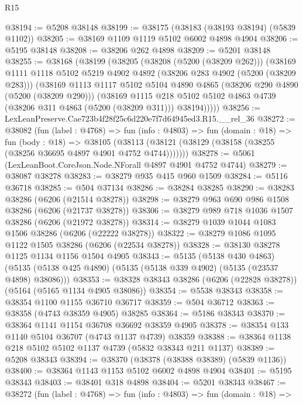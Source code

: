 \begin{lexlean}{R15}
\begin{coremodule}
{{{{{{{{{{{@38194 := @5208 @38148
@38199 := @38175 (@38183 (@38193 @38194) (@5839 @1102))
@38205 := @38169 @1109 @1119 @5102 @6002 @4898 @4904
@38206 := @5195 @38148
@38208 := @38206 @262 @4898
@38209 := @5201 @38148
@38255 := @38168
    (@38199
      (@38205
        (@38208 (@5200 (@38209 @262)))
        (@38169
          @1111
          @1118
          @5102
          @5219
          @4902
          @4892
          (@38206 @283 @4902 (@5200 (@38209 @283)))
          (@38169
            @1113
            @1117
            @5102
            @5104
            @4890
            @4865
            (@38206 @290 @4890 (@5200 (@38209 @290)))
            (@38169
              @1115
              @218
              @5102
              @5102
              @4863
              @4739
              (@38206 @311 @4863 (@5200 (@38209 @311)))
              @38194)))))
@38256 := LexLeanPreserve.Cae723b4f28f25c6d220e7f7d64945ed3.R15.__rel_36
@38272 := @38082
    (fun (label : @4768) =>
    fun (info : @4803) =>
    fun (domain : @18) =>
    fun (body : @18) =>
    @38105 (@38113 (@38121 (@38129 (@38158 (@38255 (@38256 @36695 @4897 @4901 @4752 @4744)))))))
@38278 := @5061 (LexLeanBoot.CoreJson.Node.NForall @4897 @4901 @4752 @4744)
@38279 := @38087 @38278
@38283 := @38279 @935 @415 @960 @1509
@38284 := @5116 @36718
@38285 := @504 @37134
@38286 := @38284 @38285
@38290 := @38283 @38286 (@6206 (@21514 @38278))
@38298 := @38279 @963 @690 @986 @1508 @38286 (@6206 (@21737 @38278))
@38306 := @38279 @989 @718 @1036 @1507 @38286 (@6206 (@21972 @38278))
@38314 := @38279 @1039 @1044 @1083 @1506 @38286 (@6206 (@22222 @38278))
@38322 := @38279 @1086 @1095 @1122 @1505 @38286 (@6206 (@22534 @38278))
@38328 := @38130 @38278 @1125 @1134 @1156 @1504 @4905
@38343 := @5135
    (@5138 @430 @4863)
    (@5135 (@5138 @425 @4890) (@5135 (@5138 @339 @4902) (@5135 (@23537 @4898) @38086)))
@38353 := @38328 @38343 @38286 (@6206 (@22828 @38278)) (@5164 (@5165 @1134 @4905 @38086))
@38354 := @5538 @38343
@38358 := @38354 @1100 @1155 @36710 @36717
@38359 := @504 @36712
@38363 := @38358 (@4743 @38359 @4905) @38285
@38364 := @5186 @38343
@38370 := @38364 @1141 @1154 @36708 @36692 @38359 @4905
@38378 := @38354 @133 @1140 @5104 @36707 (@4743 @1137 @4739) @38359
@38388 := @38364 @1138 @218 @5102 @5102 @1137 @4739 (@5832 @38343 @211 @1137)
@38389 := @5208 @38343
@38394 := @38370 (@38378 (@38388 @38389) (@5839 @1136))
@38400 := @38364 @1143 @1153 @5102 @6002 @4898 @4904
@38401 := @5195 @38343
@38403 := @38401 @318 @4898
@38404 := @5201 @38343
@38467 := @38272
    (fun (label : @4768) =>
    fun (info : @4803) =>
    fun (domain : @18) =>
}}}}}}}}}}}
\end{coremodule}
\end{lexlean}
